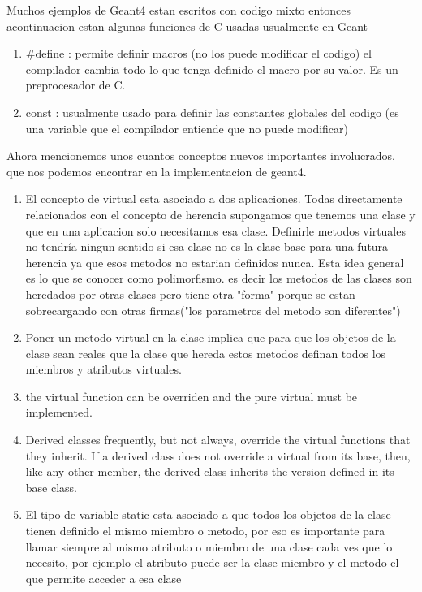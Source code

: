 \documentclass[10pt,a4paper,oneside]{book}
\begin{document}
Muchos ejemplos de Geant4 estan escritos con codigo mixto entonces
acontinuacion estan algunas funciones de C usadas usualmente en Geant
\begin{enumerate}
\item $\#$define : permite definir macros (no los puede modificar el
  codigo) el compilador cambia todo lo que tenga definido el macro por
  su valor. Es un preprocesador de C.
\item const : usualmente usado para definir las constantes globales
  del codigo (es una variable que el compilador entiende que no puede
  modificar)
\end{enumerate}

Ahora mencionemos unos cuantos conceptos nuevos importantes
involucrados, que nos podemos encontrar en la implementacion de
geant4.
\begin{enumerate}
\item El concepto de virtual esta asociado a dos aplicaciones. Todas
  directamente relacionados con el concepto de herencia supongamos que
  tenemos una clase y que en una aplicacion solo necesitamos esa
  clase. Definirle metodos virtuales no tendría ningun sentido si esa
  clase no es la clase base para una futura herencia ya que esos
  metodos no estarian definidos nunca. Esta idea general es lo que se
  conocer como polimorfismo. es decir los metodos de las clases son
  heredados por otras clases pero tiene otra "forma" porque se estan
  sobrecargando con otras firmas("los parametros del metodo son
  diferentes")
\item Poner un metodo virtual en la clase implica que para que los
  objetos de la clase sean reales que la clase que hereda estos
  metodos definan todos los miembros y atributos virtuales.
\item the virtual function can be overriden and the pure virtual must
  be implemented.
\item Derived classes frequently, but not always, override the virtual
  functions that they inherit. If a derived class does not override a
  virtual from its base, then, like any other member, the derived
  class inherits the version defined in its base class.
\item El tipo de variable static esta asociado a que todos los objetos
  de la clase tienen definido el mismo miembro o metodo, por eso es
  importante para llamar siempre al mismo atributo o miembro de una
  clase cada ves que lo necesito, por ejemplo el atributo puede ser la
  clase miembro y el metodo el que permite acceder a esa clase

\end{enumerate}
\end{document}
